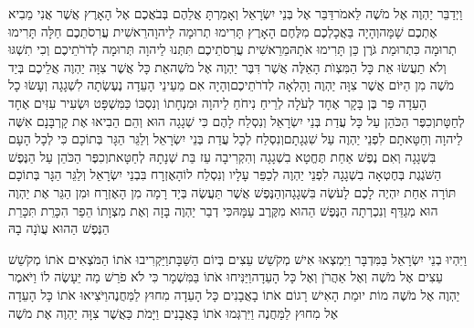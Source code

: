 \documentclass[../main/main.tex]{subfiles}
\begin{document}
\begin{multicols}{\ncols}
וַיְדַבֵּר יַהְוֶה אֶל מֹשֶׁה לֵּאמֹר\PreVerseSpace{}דַּבֵּר אֶל בְּנֵי יִשְׂרָאֵל וְאָמַרְתָּ אֲלֵהֶם בְּבֹאֲכֶם אֶל הָאָרֶץ אֲשֶׁר אֲנִי מֵבִיא אֶתְכֶם שָׁמָּה\PreVerseSpace{}וְהָיָה בַּאֲכָלְכֶם מִלֶּחֶם הָאָרֶץ תָּרִימוּ תְרוּמָה לַיהוָה\PreVerseSpace{}רֵאשִׁית עֲרִסֹתֵכֶם חַלָּה תָּרִימוּ תְרוּמָה כִּתְרוּמַת גֹּרֶן כֵּן תָּרִימוּ אֹתָהּ\PreVerseSpace{}מֵרֵאשִׁית עֲרִסֹתֵיכֶם תִּתְּנוּ לַיהוָה תְּרוּמָה לְדֹרֹתֵיכֶם \ClosedSection{}וְכִי תִשְׁגּוּ וְלֹא תַעֲשׂוּ אֵת כָּל הַמִּצְוֺת הָאֵלֶּה אֲשֶׁר דִּבֶּר יַהְוֶה אֶל מֹשֶׁה\PreVerseSpace{}אֵת כָּל אֲשֶׁר צִוָּה יַהְוֶה אֲלֵיכֶם בְּיַד מֹשֶׁה מִן הַיּוֹם אֲשֶׁר צִוָּה יַהְוֶה וָהָלְאָה לְדֹרֹתֵיכֶם\PreVerseSpace{}וְהָיָה אִם מֵעֵינֵי הָעֵדָה נֶעֶשְׂתָה לִשְׁגָגָה וְעָשׂוּ כָל הָעֵדָה פַּר בֶּן בָּקָר אֶחָד לְעֹלָה לְרֵיחַ נִיחֹחַ לַיהוָה וּמִנְחָתוֹ וְנִסְכּוֹ כַּמִּשְׁפָּט וּשְׂעִיר עִזִּים אֶחָד לְחַטָּת\PreVerseSpace{}וְכִפֶּר הַכֹּהֵן עַל כָּל עֲדַת בְּנֵי יִשְׂרָאֵל וְנִסְלַח לָהֶם כִּי שְׁגָגָה הוּא וְהֵם הֵבִיאוּ אֶת קָרְבָּנָם אִשֶּׁה לַיהוָה וְחַטָּאתָם לִפְנֵי יַהְוֶה עַל שִׁגְגָתָם\PreVerseSpace{}וְנִסְלַח לְכָל עֲדַת בְּנֵי יִשְׂרָאֵל וְלַגֵּר הַגָּר בְּתוֹכָם כִּי לְכָל הָעָם בִּשְׁגָגָה \ClosedSection{}וְאִם נֶפֶשׁ אַחַת תֶּחֱטָא בִשְׁגָגָה וְהִקְרִיבָה עֵז בַּת שְׁנָתָהּ לְחַטָּאת\PreVerseSpace{}וְכִפֶּר הַכֹּהֵן עַל הַנֶּפֶשׁ הַשֹּׁגֶגֶת בְּחֶטְאָה בִשְׁגָגָה לִפְנֵי יַהְוֶה לְכַפֵּר עָלָיו וְנִסְלַח לוֹ\PreVerseSpace{}הָאֶזְרָח בִּבְנֵי יִשְׂרָאֵל וְלַגֵּר הַגָּר בְּתוֹכָם תּוֹרָה אַחַת יִהְיֶה לָכֶם לָעֹשֶׂה בִּשְׁגָגָה\PreVerseSpace{}וְהַנֶּפֶשׁ אֲשֶׁר תַּעֲשֶׂה בְּיָד רָמָה מִן הָאֶזְרָח וּמִן הַגֵּר אֶת יַהְוֶה הוּא מְגַדֵּף וְנִכְרְתָה הַנֶּפֶשׁ הַהוּא מִקֶּרֶב עַמָּהּ\PreVerseSpace{}כִּי דְבַר יַהְוֶה בָּזָה וְאֶת מִצְוָתוֹ הֵפַר הִכָּרֵת תִּכָּרֵת הַנֶּפֶשׁ הַהוּא עֲוֺנָה בָהּ\OpenSection{}\par
{}וַיִּהְיוּ בְנֵי יִשְׂרָאֵל בַּמִּדְבָּר וַיִּמְצְאוּ אִישׁ מְקֹשֵׁשׁ עֵצִים בְּיוֹם הַשַּׁבָּת\PreVerseSpace{}וַיַּקְרִיבוּ אֹתוֹ הַמֹּצְאִים אֹתוֹ מְקֹשֵׁשׁ עֵצִים אֶל מֹשֶׁה וְאֶל אַהֲרֹן וְאֶל כָּל הָעֵדָה\PreVerseSpace{}וַיַּנִּיחוּ אֹתוֹ בַּמִּשְׁמָר כִּי לֹא פֹרַשׁ מַה יֵּעָשֶׂה לוֹ \ClosedSection{}וַיֹּאמֶר יַהְוֶה אֶל מֹשֶׁה מוֹת יוּמַת הָאִישׁ רָגוֹם אֹתוֹ בָאֲבָנִים כָּל הָעֵדָה מִחוּץ לַמַּחֲנֶה\PreVerseSpace{}וַיֹּצִיאוּ אֹתוֹ כָּל הָעֵדָה אֶל מִחוּץ לַמַּחֲנֶה וַיִּרְגְּמוּ אֹתוֹ בָּאֲבָנִים וַיָּמֹת כַּאֲשֶׁר צִוָּה יַהְוֶה אֶת מֹשֶׁה\OpenSection{}\par

\end{multicols}
\end{document}
